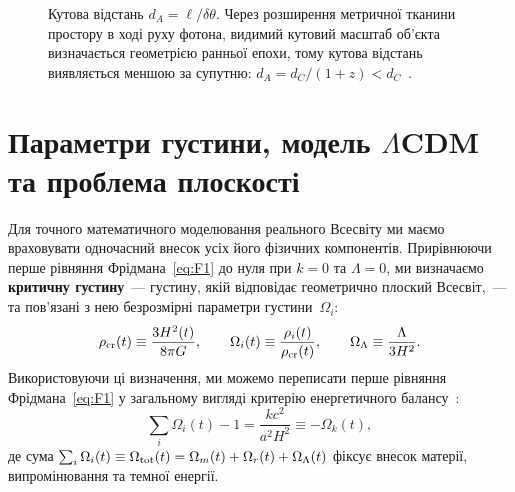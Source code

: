 \begin{figure}[h!]
\centering
{}
\caption{Кутова відстань $d_A = \ell/\delta\theta$. Через розширення метричної тканини простору в ході руху фотона, видимий кутовий масштаб об'єкта визначається геометрією ранньої епохи, тому кутова відстань виявляється меншою за супутню: $d_A = d_C/(1+z) < d_C$~\cite{Hogg1999}.}
\label{fig:angular_distance}
\end{figure}

\section{Параметри густини, модель $\Lambda$CDM та проблема плоскості}
\label{sec:lcdm_and_flatness}

Для точного математичного моделювання реального Всесвіту ми маємо враховувати одночасний внесок усіх його фізичних компонентів. Прирівнюючи перше рівняння Фрідмана~\eqref{eq:F1} до нуля при $k = 0$ та $\Lambda = 0$, ми визначаємо \textbf{критичну густину}~--- густину, якій відповідає геометрично плоский Всесвіт,~--- та пов'язані з нею безрозмірні параметри густини~$\Omega_i$:
\begin{equation}\label{eq:rho_crit_new}
  \rho_{\rm cr}(t) \equiv \frac{3H^2(t)}{8\pi G}, \qquad
  \Omega_i(t) \equiv \frac{\rho_i(t)}{\rho_{\rm cr}(t)}, \qquad
  \Omega_\Lambda \equiv \frac{\Lambda}{3H^2}.
\end{equation}
Використовуючи ці визначення, ми можемо переписати перше рівняння Фрідмана~\eqref{eq:F1} у загальному вигляді критерію енергетичного балансу~\cite{Weinberg2008,Baumann2022}:
\begin{equation}\label{eq:omega_sum_k_integrated}
  \sum_i \Omega_i(t) - 1 = \frac{kc^2}{a^2 H^2} \equiv -\Omega_k(t),
\end{equation}
де сума $\sum_i \Omega_i(t) \equiv \Omega_{\rm tot}(t) = \Omega_m(t) + \Omega_r(t) + \Omega_\Lambda(t)$ фіксує внесок матерії, випромінювання та темної енергії.

